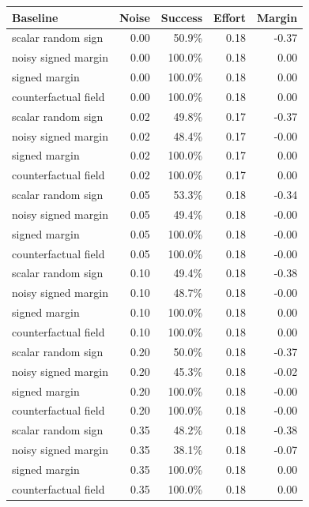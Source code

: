 \begin{tabular}{lrrrr}\toprule
Baseline & Noise & Success & Effort & Margin\\
\midrule
scalar random sign & 0.00 & 50.9\% & 0.18 & -0.37\\
noisy signed margin & 0.00 & 100.0\% & 0.18 & 0.00\\
signed margin & 0.00 & 100.0\% & 0.18 & 0.00\\
counterfactual field & 0.00 & 100.0\% & 0.18 & 0.00\\
scalar random sign & 0.02 & 49.8\% & 0.17 & -0.37\\
noisy signed margin & 0.02 & 48.4\% & 0.17 & -0.00\\
signed margin & 0.02 & 100.0\% & 0.17 & 0.00\\
counterfactual field & 0.02 & 100.0\% & 0.17 & 0.00\\
scalar random sign & 0.05 & 53.3\% & 0.18 & -0.34\\
noisy signed margin & 0.05 & 49.4\% & 0.18 & -0.00\\
signed margin & 0.05 & 100.0\% & 0.18 & -0.00\\
counterfactual field & 0.05 & 100.0\% & 0.18 & -0.00\\
scalar random sign & 0.10 & 49.4\% & 0.18 & -0.38\\
noisy signed margin & 0.10 & 48.7\% & 0.18 & -0.00\\
signed margin & 0.10 & 100.0\% & 0.18 & 0.00\\
counterfactual field & 0.10 & 100.0\% & 0.18 & 0.00\\
scalar random sign & 0.20 & 50.0\% & 0.18 & -0.37\\
noisy signed margin & 0.20 & 45.3\% & 0.18 & -0.02\\
signed margin & 0.20 & 100.0\% & 0.18 & -0.00\\
counterfactual field & 0.20 & 100.0\% & 0.18 & -0.00\\
scalar random sign & 0.35 & 48.2\% & 0.18 & -0.38\\
noisy signed margin & 0.35 & 38.1\% & 0.18 & -0.07\\
signed margin & 0.35 & 100.0\% & 0.18 & 0.00\\
counterfactual field & 0.35 & 100.0\% & 0.18 & 0.00\\
\bottomrule\end{tabular}
